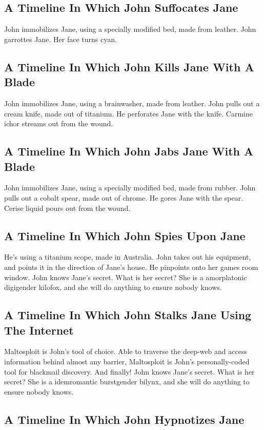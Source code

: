 \documentclass{article}
\begin{document}
\subsection{A Timeline In Which John Suffocates Jane}


John immobilizes Jane, using a specially modified bed, made from leather.
John garrottes Jane.
Her face turns cyan.
\subsection{A Timeline In Which John Kills Jane With A Blade}


John immobilizes Jane, using a brainwasher, made from leather.
John pulls out a cream knife, made out of titanium.
He perforates Jane with the knife.
Carmine ichor streams out from the wound.
\subsection{A Timeline In Which John Jabs Jane With A Blade}


John immobilizes Jane, using a specially modified bed, made from rubber.
John pulls out a cobalt spear, made out of chrome.
He gores Jane with the spear.
Cerise liquid pours out from the wound.
\subsection{A Timeline In Which John Spies Upon Jane}


He's using a titanium scope, made in Australia.
John takes out his equipment, and points it in the direction of Jane's house. He pinpoints onto her games room window.
John knows Jane's secret. What is her secret? She is a amorplatonic digigender kilofox, and she will do anything to ensure nobody knows.
\subsection{A Timeline In Which John Stalks Jane Using The Internet}


Maltosploit is John's tool of choice. Able to traverse the deep{-}web and access information behind almost any barrier, Maltosploit is John's personally{-}coded tool for blackmail discovery.
And finally!
John knows Jane's secret. What is her secret? She is a idemromantic burstgender bilynx, and she will do anything to ensure nobody knows.
\subsection{A Timeline In Which John Hypnotizes Jane}
\end{document}
